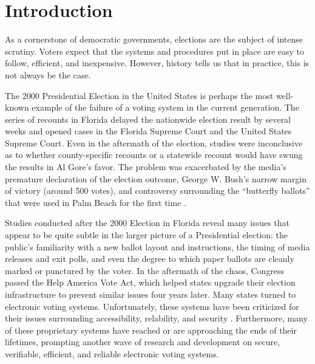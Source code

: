 \chapter{Introduction} \label{intro}

As a cornerstone of democratic governments, elections are the subject of intense scrutiny. Voters expect that the systems and procedures put in place are easy to follow, efficient, and inexpensive. However, history tells us that in practice, this is not always be the case.

The 2000 Presidential Election in the United States is perhaps the most well-known example of the failure of a voting system in the current generation. The series of recounts in Florida delayed the nationwide election result by several weeks and opened cases in the Florida Supreme Court and the United States Supreme Court. Even in the aftermath of the election, studies were inconclusive as to whether county-specific recounts or a statewide recount would have swung the results in Al Gore's favor. The problem was exacerbated by the media's premature declaration of the election outcome, George W. Bush's narrow margin of victory (around 500 votes), and controversy surrounding the ``butterfly ballots'' that were used in Palm Beach for the first time \cite{wiki:2000-fl-pres}.

Studies conducted after the 2000 Election in Florida reveal many issues that appear to be quite subtle in the larger picture of a Presidential election: the public's familiarity with a new ballot layout and instructions, the timing of media releases and exit polls, and even the degree to which paper ballots are cleanly marked or punctured by the voter. In the aftermath of the chaos, Congress passed the Help America Vote Act, which helped states upgrade their election infrastructure to prevent similar issues four years later. Many states turned to electronic voting systems. Unfortunately, these systems have been criticized for their issues surrounding accessibility, relability, and security \cite{wiki:dre}. Furthermore, many of these proprietary systems have reached or are approaching the ends of their lifetimes, prompting another wave of research and development on secure, verifiable, efficient, and reliable electronic voting systems.


